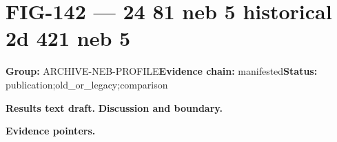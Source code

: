 \clearpage
\section{FIG-142 --- 24 81 neb 5 historical 2d 421 neb 5}
\label{figpage:fig-142}
\textbf{Group:} ARCHIVE-NEB-PROFILE\quad \textbf{Evidence chain:} manifested\quad \textbf{Status:} publication;old\_or\_legacy;comparison

\textbf{Results text draft.} 
\textbf{Discussion and boundary.} 


\textbf{Evidence pointers.}



\vfill
